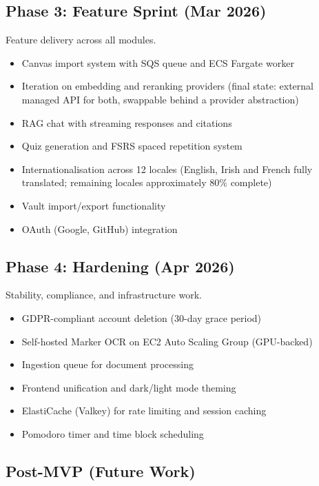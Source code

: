 \documentclass[12pt,a4paper]{article}
\begin{document}
\subsection{Phase 3: Feature Sprint (Mar 2026)}

Feature delivery across all modules.

\begin{itemize}
    \item Canvas import system with SQS queue and ECS Fargate worker
    \item Iteration on embedding and reranking providers (final state: external managed API for both, swappable behind a provider abstraction)
    \item RAG chat with streaming responses and citations
    \item Quiz generation and FSRS spaced repetition system
    \item Internationalisation across 12 locales (English, Irish and French fully translated; remaining locales approximately 80\% complete)
    \item Vault import/export functionality
    \item OAuth (Google, GitHub) integration
\end{itemize}

\subsection{Phase 4: Hardening (Apr 2026)}

Stability, compliance, and infrastructure work.

\begin{itemize}
    \item GDPR-compliant account deletion (30-day grace period)
    \item Self-hosted Marker OCR on EC2 Auto Scaling Group (GPU-backed)
    \item Ingestion queue for document processing
    \item Frontend unification and dark/light mode theming
    \item ElastiCache (Valkey) for rate limiting and session caching
    \item Pomodoro timer and time block scheduling
\end{itemize}

\subsection{Post-MVP (Future Work)}
\end{document}
